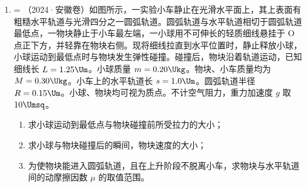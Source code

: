\documentclass[\gkver]{gaokaozhenti}
\makeatletter
\newcommand{\tiinfo}[2]{{\small\color{gray}（#1）\textcolor{orange!85!black}{\nandu{#2}}}\hspace{0.4em}}
\newenvironment{tibody}
  {\begin{minipage}[t]{\linewidth}\@listdepth=\@ne\leavevmode\ignorespaces}
  {\end{minipage}}
\makeatother
\begin{document}
\begin{enumerate}[resume=tiku]
\begin{tibody}
\end{tibody}


\item
\begin{tibody}
\tiinfo{2024·安徽卷}{3}如图所示，一实验小车静止在光滑水平面上，其上表面有粗糙水平轨道与光滑四分之一圆弧轨道。圆弧轨道与水平轨道相切于圆弧轨道最低点，一物块静止于小车最左端，一小球用不可伸长的轻质细线悬挂于 O 点正下方，并轻靠在物块右侧。现将细线拉直到水平位置时，静止释放小球，小球运动到最低点时与物块发生弹性碰撞。碰撞后，物块沿着轨道运动，已知细线长 $L = 1.25 \Um$。小球质量 $m = 0.20 \Ukg$。物块、小车质量均为 $M = 0.30 \Ukg$。小车上的水平轨道长 $s = 1.0 \Um$。圆弧轨道半径 $R = 0.15 \Um$。小球、物块均可视为质点。不计空气阻力，重力加速度 $g$ 取 $10 \Umsq$。
\begin{enumerate}
	\item
	求小球运动到最低点与物块碰撞前所受拉力的大小；
	\item
	求小球与物块碰撞后的瞬间，物块速度的大小；
	\item
	为使物块能进入圆弧轨道，且在上升阶段不脱离小车，求物块与水平轨道间的动摩擦因数 $\mu$ 的取值范围。
\end{enumerate}
\end{tibody}


\end{enumerate}
\end{document}
